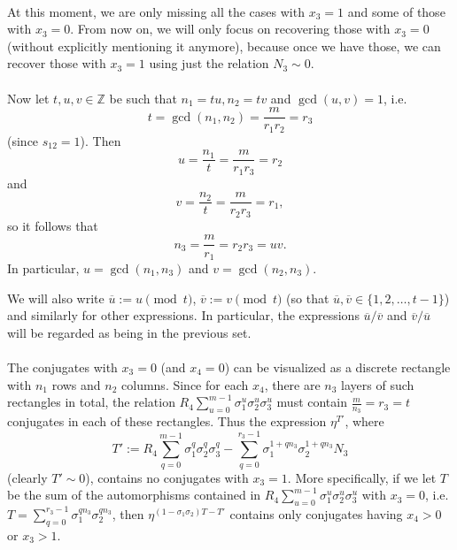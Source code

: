 \documentclass[12pt,a4paper]{article}
\newcommand{\Z}{\mathbb{Z}}
\newcommand{\uo}{\overline{u}}
\newcommand{\vo}{\overline{v}}
\newcommand{\lcm}{\mathrm{lcm}}
\begin{document}
\paragraph*{}
At this moment, we are only missing all the cases with $x_3=1$ and some of those with $x_3=0$. From now on, we will only focus on recovering those with $x_3=0$ (without explicitly mentioning it anymore), because once we have those, we can recover those with $x_3=1$ using just the relation $N_3\sim 0$.
\paragraph*{}
Now let $t,u,v\in\Z$ be such that $n_1=tu,n_2=tv$ and $\gcd(u,v)=1$, i.e. $$t=\gcd(n_1,n_2)=\frac{m}{r_1r_2}=r_3$$ (since $s_{12}=1$). Then $$u=\frac{n_1}{t}=\frac{m}{r_1r_3}=r_2$$
and $$v=\frac{n_2}{t}=\frac{m}{r_2r_3}=r_1,$$
so it follows that $$n_3=\frac{m}{r_1}=r_2r_3=uv.$$
In particular, $u=\gcd(n_1,n_3)$ and $v=\gcd(n_2,n_3)$.

We will also write $\uo:=u\pmod{t}$, $\vo:=v\pmod{t}$ (so that $\uo,\vo\in\{1,2,\dots,t-1\}$) and similarly for other expressions. In particular, the expressions $\uo/\vo$ and $\vo/\uo$ will be regarded as being in the previous set.
\paragraph*{}
The conjugates with $x_3=0$ (and $x_4=0$) can be visualized as a discrete rectangle with $n_1$ rows and $n_2$ columns. Since for each $x_4$, there are $n_3$ layers of such rectangles in total, the relation $R_4\sum_{u=0}^{m-1}\sigma_1^{u}\sigma_2^{u}\sigma_3^{u}$ must contain $\frac{m}{n_3}=r_3=t$ conjugates in each of these rectangles. Thus the expression $\eta^{T'}$, where  $$T':=R_4\sum_{q=0}^{m-1}\sigma_1^{q}\sigma_2^{q}\sigma_3^{q}-\sum_{q=0}^{r_3-1} \sigma_1^{1+q n_3}\sigma_2^{1+q n_3}N_3 $$
(clearly $T'\sim 0$), contains no conjugates with $x_3=1$. More specifically, if we let $T$ be the sum of the automorphisms contained in  $R_4\sum_{u=0}^{m-1}\sigma_1^{u}\sigma_2^{u}\sigma_3^{u}$ with $x_3=0$, i.e. $T=\sum_{q=0}^{r_3-1}\sigma_1^{qn_3}\sigma_2^{qn_3}$, then $\eta^{(1-\sigma_1\sigma_2)T-T'}$ contains only conjugates having $x_4>0$ or $x_3>1$.%
\end{document}
